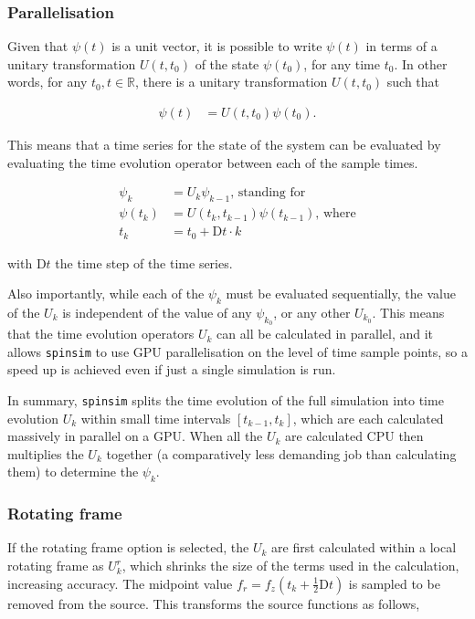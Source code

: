 \documentclass{jors}
\begin{document}
		\subsubsection*{Parallelisation}
			Given that \(\psi(t)\) is a unit vector, it is possible to write \(\psi(t)\) in terms of a unitary transformation \(U(t, t_0)\) of the state \(\psi(t_0)\), for any time \(t_0\). In other words, for any \(t_0,t \in \mathbb{R}\), there is a unitary transformation \(U(t, t_0)\) such that
			
			\begin{align*}
				\psi(t) &= U(t, t_0)\psi(t_0).
			\end{align*}
			
			This means that a time series for the state of the system can be evaluated by evaluating the time evolution operator between each of the sample times.
			
			\begin{align*}
				\psi_k &= U_k\psi_{k-1}\textrm{, standing for}\\
				\psi(t_{k}) &= U(t_{k}, t_{k-1})\psi(t_{k-1})\textrm{, where}\\
				t_k &= t_0 + \mathrm{D}t\cdot k
			\end{align*}
			
			with \(\mathrm{D}t\) the time step of the time series.

			Also importantly, while each of the \(\psi_k\) must be evaluated sequentially, the value of the \(U_k\) is independent of the value of any \(\psi_{k_0}\), or any other \(U_{k_0}\). This means that the time evolution operators \(U_k\) can all be calculated in parallel, and it allows \texttt{spinsim} to use GPU parallelisation on the level of time sample points, so a speed up is achieved even if just a single simulation is run.

			In summary, \texttt{spinsim} splits the time evolution of the full simulation into time evolution \(U_k\) within small time intervals \([t_{k - 1}, t_{k}]\), which are each calculated massively in parallel on a GPU. When all the \(U_k\) are calculated CPU then multiplies the \(U_k\) together (a comparatively less demanding job than calculating them) to determine the \(\psi_k\).

		\subsubsection*{Rotating frame}
			If the rotating frame option is selected, the \(U_k\) are first calculated within a local rotating frame as \(U^r_k\), which shrinks the size of the terms used in the calculation, increasing accuracy. The midpoint value \(f_r = f_z(t_k + \frac12\mathrm{D}t)\) is sampled to be removed from the source. This transforms the source functions as follows,
			
\end{document}
